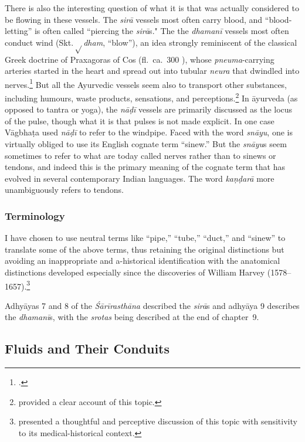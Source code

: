 \label{intro:tubes} There is also the interesting question of what it
is that was actually considered to be flowing in these vessels.  The
\emph{sirā} vessels most often carry blood, and “blood-letting” is
often called “piercing the \emph{sirā}s."  The the \emph{dhamanī}
vessels most often conduct wind (Skt.\,{\small$\sqrt{}$}\emph{dham},
“blow”), an idea strongly reminiscent of the classical Greek doctrine
of Praxagoras of Cos (fl.\ ca.\ 300 \BCE), whose
\emph{pneuma}-carrying arteries started in the heart and spread out
into tubular \emph{neura} that dwindled into
nerves.\footnote{\cites[17--19,
        49--53]{stec-1958}[137]{phil-1973}[137--159 et passim]{wals-2016}.}
But all the Ayurvedic vessels seem also to transport other substances,
including humours, waste products, sensations, and
perceptions.\footnote{\citet[344--52]{dasg-hist} provided a clear
    account of this topic.} In āyurveda (as opposed to tantra or yoga),
the \emph{nāḍī} vessels are primarily discussed as the locus of the
pulse, though what it is that pulses is not made explicit.  In one
case Vāgbhaṭa used \emph{nāḍī} to refer to the windpipe.  Faced with
the word \emph{snāyu}, one is virtually obliged to use its English
cognate term “sinew.”  But the \emph{snāyu}s seem sometimes to refer
to what are today called nerves rather than to sinews or tendons, and
indeed this is the primary meaning of the cognate term that has
evolved in several contemporary Indian languages. The word
\emph{kaṇḍarā} more unambiguously refers to tendons.

\subsubsection{Terminology}

I have chosen to use neutral terms like “pipe,” “tube,” “duct,” and
“sinew” to translate some of the above terms, thus retaining the
original distinctions but avoiding an inappropriate and a-historical
identification with the anatomical distinctions developed especially
since the discoveries of William Harvey 
(1578--1657).\footnote{\citet[27--29]{kutu-1962} presented a thoughtful and 
perceptive discussion of this topic with sensitivity to its medical-historical 
context.}

Adhyāyas 7 and 8 of the \emph{Śārīrasthāna} described the \emph{sirā}s
and adhyāya 9 describes the \emph{dhamanī}s, with the \emph{srotas} being
described at the end of chapter~9.

\subsection{Fluids and Their Conduits}

